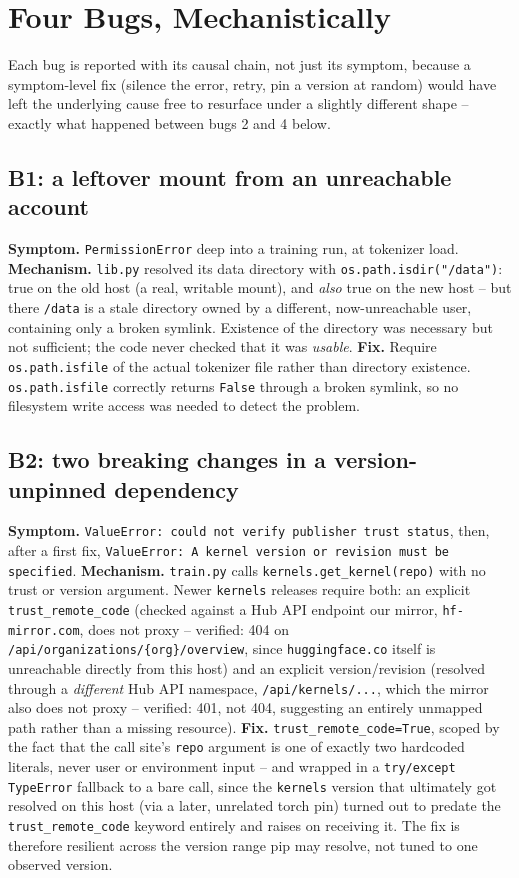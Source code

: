 \documentclass{article}
\begin{document}
\section{Four Bugs, Mechanistically}
Each bug is reported with its causal chain, not just its symptom, because a symptom-level fix (silence the error, retry, pin a version at random) would have left the underlying cause free to resurface under a slightly different shape -- exactly what happened between bugs 2 and 4 below.

\subsection{B1: a leftover mount from an unreachable account}
\textbf{Symptom.} \texttt{PermissionError} deep into a training run, at tokenizer load.
\textbf{Mechanism.} \texttt{lib.py} resolved its data directory with \texttt{os.path.isdir("/data")}: true on the old host (a real, writable mount), and \emph{also} true on the new host -- but there \texttt{/data} is a stale directory owned by a different, now-unreachable user, containing only a broken symlink. Existence of the directory was necessary but not sufficient; the code never checked that it was \emph{usable}.
\textbf{Fix.} Require \texttt{os.path.isfile} of the actual tokenizer file rather than directory existence. \texttt{os.path.isfile} correctly returns \texttt{False} through a broken symlink, so no filesystem write access was needed to detect the problem.

\subsection{B2: two breaking changes in a version-unpinned dependency}
\textbf{Symptom.} \texttt{ValueError: could not verify publisher trust status}, then, after a first fix, \texttt{ValueError: A kernel version or revision must be specified}.
\textbf{Mechanism.} \texttt{train.py} calls \texttt{kernels.get\_kernel(repo)} with no trust or version argument. Newer \texttt{kernels} releases require both: an explicit \texttt{trust\_remote\_code} (checked against a Hub API endpoint our mirror, \texttt{hf-mirror.com}, does not proxy -- verified: 404 on \texttt{/api/organizations/\{org\}/overview}, since \texttt{huggingface.co} itself is unreachable directly from this host) and an explicit version/revision (resolved through a \emph{different} Hub API namespace, \texttt{/api/kernels/...}, which the mirror also does not proxy -- verified: 401, not 404, suggesting an entirely unmapped path rather than a missing resource).
\textbf{Fix.} \texttt{trust\_remote\_code=True}, scoped by the fact that the call site's \texttt{repo} argument is one of exactly two hardcoded literals, never user or environment input -- and wrapped in a \texttt{try/except TypeError} fallback to a bare call, since the \texttt{kernels} version that ultimately got resolved on this host (via a later, unrelated torch pin) turned out to predate the \texttt{trust\_remote\_code} keyword entirely and raises on receiving it. The fix is therefore resilient across the version range pip may resolve, not tuned to one observed version.
\end{document}
